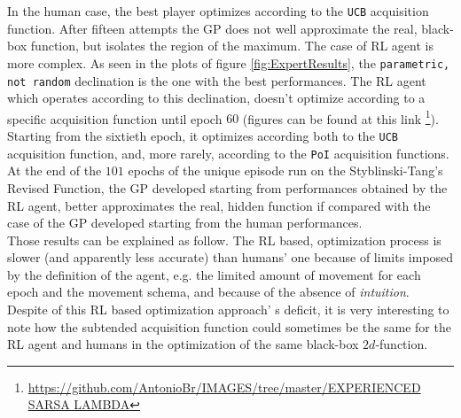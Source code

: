 In the human case, the best player optimizes according to the {\tt UCB} acquisition function. After fifteen attempts the GP does not well approximate the real, black-box function, but isolates the region of the maximum. The case of RL agent is more complex. As seen in the plots of figure \ref{fig:ExpertResults}, the {\tt parametric, not random} declination is the one with the best performances. The RL agent which operates according to this declination, doesn't optimize according to a specific acquisition function until epoch $60$ (figures can be found at this link \footnote{\url{https://github.com/AntonioBr/IMAGES/tree/master/EXPERIENCED SARSA LAMBDA}}). Starting from the sixtieth epoch, it optimizes according both to the {\tt UCB} acquisition function, and, more rarely, according to the {\tt PoI} acquisition functions. At the end of the $101$ epochs of the unique episode run on the Styblinski-Tang's Revised Function, the GP developed starting from performances obtained by the RL agent, better approximates the real, hidden function if compared with the case of the GP developed starting from the human performances. \\

Those results can be explained as follow. The RL based, optimization process is slower (and apparently less accurate) than humans' one because of limits imposed by the definition of the agent, e.g. the limited amount of movement for each epoch and the movement schema, and because of the absence of \textit{intuition}. Despite of this RL based optimization approach' s deficit, it is very interesting to note how the subtended acquisition function could sometimes be the same for the RL agent and humans in the optimization of the same black-box $2d$-function. 


